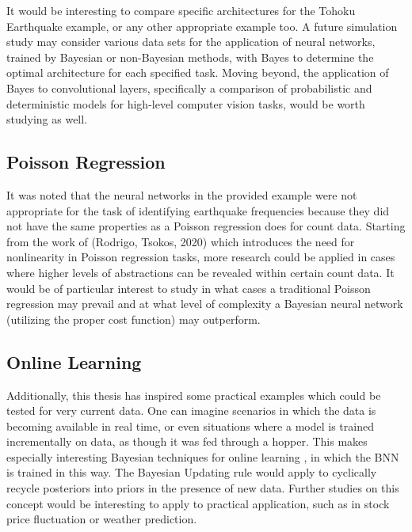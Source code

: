 It would be interesting to compare specific architectures for the Tohoku Earthquake example, or any other appropriate example too.  A future simulation study may consider various data sets for the application of neural networks, trained by Bayesian or non-Bayesian methods, with Bayes to determine the optimal architecture for each specified task.  Moving beyond, the application of Bayes to convolutional layers, specifically a comparison of probabilistic and deterministic models for high-level computer vision tasks, would be worth studying as well.

\subsection{Poisson Regression}

It was noted that the neural networks in the provided example were not appropriate for the task of identifying earthquake frequencies because they did not have the same properties as a Poisson regression does for count data.  Starting from the work of (Rodrigo, Tsokos, 2020) \cite{rodrigo2020bayesian} which introduces the need for nonlinearity in Poisson regression tasks, more research could be applied in cases where higher levels of abstractions can be revealed within certain count data.  It would be of particular interest to study in what cases a traditional Poisson regression may prevail and at what level of complexity a Bayesian neural network (utilizing the proper cost function) may outperform.


\subsection{Online Learning}
Additionally, this thesis has inspired some practical examples which could be tested for very current data. One can imagine scenarios in which the data is becoming available in real time, or even situations where a model is trained incrementally on data, as though it was fed through a hopper.  This makes especially interesting Bayesian techniques for online learning \cite{opper1999bayesian}, in which the BNN is trained in this way.  The Bayesian Updating rule would apply to cyclically recycle posteriors into priors in the presence of new data.  Further studies on this concept would be interesting to apply to practical application, such as in stock price fluctuation or weather prediction.

